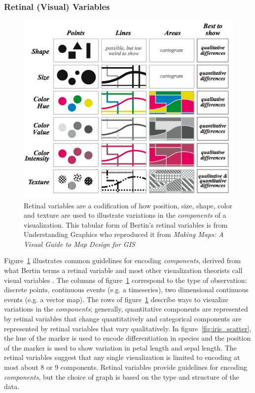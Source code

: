 \documentclass[../main.tex]{subfiles}
\begin{document}
\subsubsection{Retinal (Visual) Variables}
\label{sec:intro_visual_variables}
\begin{figure}[h!]
\includegraphics[width=1\textwidth]{figures/intro/retinal_variables.png}
\caption{Retinal variables are a codification of how position, size, shape, color and texture are used to illustrate variations in the \textit{components} of a visualization. This tabular form of Bertin's retinal variables is from Understanding Graphics \cite{malamedInformationDisplayTips2010} who reproduced it from \textit{Making Maps: A Visual Guide to Map Design for GIS} 
\cite{krygierMakingMapsVisual2005}}
\label{fig:retinal_variables}
\end{figure}

Figure~\ref{fig:retinal_variables} illustrates common guidelines for encoding \textit{components}, derived from what Bertin terms a retinal variable and most other visualization theorists call visual variables \cite{bertin_semiology_2011,krygier_making_2005,chambers_graphical_1983,wilkinson_grammar_2005,munzner_visualization_2014}. The columns of figure~\ref{fig:retinal_variables} correspond to the type of observation: discrete points, continuous events (e.g. a timeseries), two dimensional continuous events (e.g. a vector map). The rows of figure~\ref{fig:retinal_variables} describe ways to visualize variations in the \textit{components}; generally, quantitative components are represented by retinal variables that change quantitatively and categorical components are represented by retinal variables that vary qualitatively. In figure~\ref{fig:iris_scatter}, the hue of the marker is used to encode differentiation in species and the position of the marker is used to show variation in petal length and sepal length. The retinal variables suggest that any single visualization is limited to encoding at most about 8 or 9 components. Retinal variables provide guidelines for encoding \textit{components}, but the choice of graph is based on the type and structure of the data. 
\end{document}
